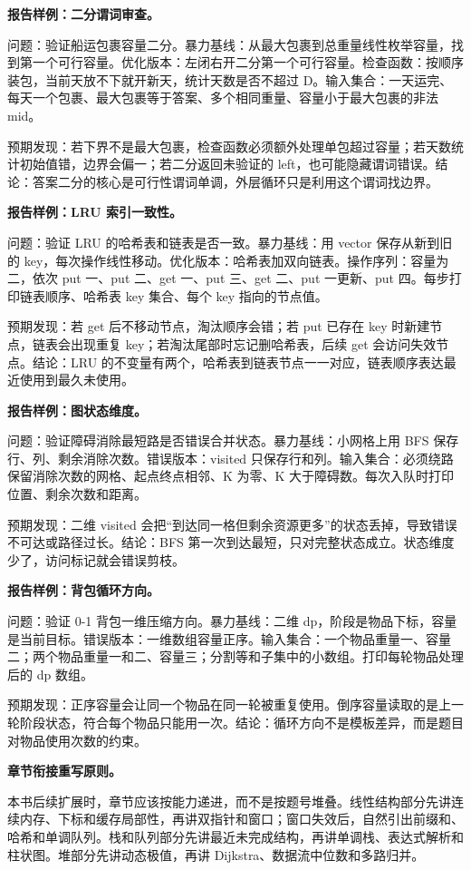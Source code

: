 \noindent\textbf{报告样例：二分谓词审查。}

问题：验证船运包裹容量二分。暴力基线：从最大包裹到总重量线性枚举容量，找到第一个可行容量。优化版本：左闭右开二分第一个可行容量。检查函数：按顺序装包，当前天放不下就开新天，统计天数是否不超过 D。输入集合：一天运完、每天一个包裹、最大包裹等于答案、多个相同重量、容量小于最大包裹的非法 mid。

预期发现：若下界不是最大包裹，检查函数必须额外处理单包超过容量；若天数统计初始值错，边界会偏一；若二分返回未验证的 left，也可能隐藏谓词错误。结论：答案二分的核心是可行性谓词单调，外层循环只是利用这个谓词找边界。

\noindent\textbf{报告样例：LRU 索引一致性。}

问题：验证 LRU 的哈希表和链表是否一致。暴力基线：用 vector 保存从新到旧的 key，每次操作线性移动。优化版本：哈希表加双向链表。操作序列：容量为二，依次 put 一、put 二、get 一、put 三、get 二、put 一更新、put 四。每步打印链表顺序、哈希表 key 集合、每个 key 指向的节点值。

预期发现：若 get 后不移动节点，淘汰顺序会错；若 put 已存在 key 时新建节点，链表会出现重复 key；若淘汰尾部时忘记删哈希表，后续 get 会访问失效节点。结论：LRU 的不变量有两个，哈希表到链表节点一一对应，链表顺序表达最近使用到最久未使用。

\noindent\textbf{报告样例：图状态维度。}

问题：验证障碍消除最短路是否错误合并状态。暴力基线：小网格上用 BFS 保存行、列、剩余消除次数。错误版本：visited 只保存行和列。输入集合：必须绕路保留消除次数的网格、起点终点相邻、K 为零、K 大于障碍数。每次入队时打印位置、剩余次数和距离。

预期发现：二维 visited 会把“到达同一格但剩余资源更多”的状态丢掉，导致错误不可达或路径过长。结论：BFS 第一次到达最短，只对完整状态成立。状态维度少了，访问标记就会错误剪枝。

\noindent\textbf{报告样例：背包循环方向。}

问题：验证 0-1 背包一维压缩方向。暴力基线：二维 dp，阶段是物品下标，容量是当前目标。错误版本：一维数组容量正序。输入集合：一个物品重量一、容量二；两个物品重量一和二、容量三；分割等和子集中的小数组。打印每轮物品处理后的 dp 数组。

预期发现：正序容量会让同一个物品在同一轮被重复使用。倒序容量读取的是上一轮阶段状态，符合每个物品只能用一次。结论：循环方向不是模板差异，而是题目对物品使用次数的约束。

\noindent\textbf{章节衔接重写原则。}

本书后续扩展时，章节应该按能力递进，而不是按题号堆叠。线性结构部分先讲连续内存、下标和缓存局部性，再讲双指针和窗口；窗口失效后，自然引出前缀和、哈希和单调队列。栈和队列部分先讲最近未完成结构，再讲单调栈、表达式解析和柱状图。堆部分先讲动态极值，再讲 Dijkstra、数据流中位数和多路归并。

